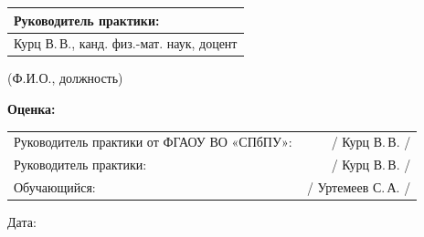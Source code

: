 \documentclass[12pt,a4paper]{article}
\newcommand{\smallnote}[1]{\begin{center}\footnotesize #1\end{center}}
\newcommand{\sigline}[1]{\underline{\hspace{42mm}}\,/ #1 /}
\begin{document}
\begin{tabularx}{\textwidth}{|>{\centering\arraybackslash}X|}
\hline
Руководитель практики:\\
\hline
Курц В.\,В., канд. физ.-мат. наук, доцент\\
\hline
\end{tabularx}
\smallnote{(Ф.И.О., должность)}

\vspace{0.8em}

\textbf{Оценка:} \underline{\hspace{35mm}}

\vspace{1.2em}

\begin{tabularx}{\textwidth}{@{}Xr@{}}
Руководитель практики от ФГАОУ ВО «СПбПУ»: & \sigline{Курц В.\,В.}\\[1.2em]
Руководитель практики: & \sigline{Курц В.\,В.}\\[1.2em]
Обучающийся: & \sigline{Уртемеев С.\,А.}\\
\end{tabularx}

\vspace{1.2em}

Дата: \underline{\hspace{35mm}}
\end{document}
